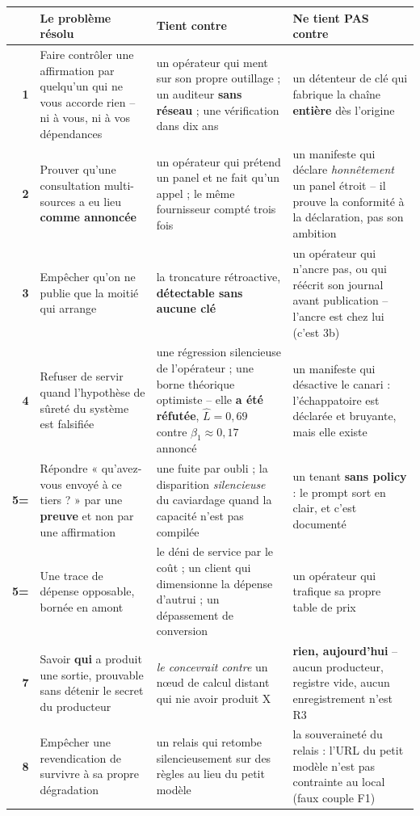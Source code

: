\documentclass[10pt]{article}
\newcommand{\pire}[1]{{\color{red}\textbf{#1}}}
\newcommand{\sz}[1]{{\small\color{grey}\textsf{#1}}}
\begin{document}
\renewcommand{\arraystretch}{1.25}
\begin{center}\footnotesize
\begin{tabular}{@{}r >{\raggedright\arraybackslash}p{4.55cm} >{\raggedright\arraybackslash}p{5.35cm} >{\raggedright\arraybackslash}p{5.35cm}@{}}
\toprule
& \textbf{Le problème résolu} & \textbf{Tient contre} & \textbf{Ne tient PAS contre} \\
\midrule
\textbf{1} & Faire contrôler une affirmation par quelqu'un qui ne vous accorde rien -- ni à vous, ni à
  vos dépendances &
  un opérateur qui ment sur son propre outillage ; un auditeur \textbf{sans réseau} ; une vérification
  dans dix ans &
  un détenteur de clé qui fabrique la chaîne \textbf{entière} dès l'origine \\
\textbf{2} & Prouver qu'une consultation multi-sources a eu lieu \textbf{comme annoncée} &
  un opérateur qui prétend un panel et ne fait qu'un appel ; le même fournisseur compté trois fois &
  un manifeste qui déclare \emph{honnêtement} un panel étroit -- il prouve la conformité à la
  déclaration, pas son ambition \\
\textbf{3} & Empêcher qu'on ne publie que la moitié qui arrange &
  la troncature rétroactive, \textbf{détectable sans aucune clé} &
  un opérateur qui n'ancre pas, ou qui réécrit son journal avant publication -- l'ancre est chez lui
  \sz{(c'est 3b)} \\
\textbf{4} & Refuser de servir quand l'hypothèse de sûreté du système est falsifiée &
  une régression silencieuse de l'opérateur ; une borne théorique optimiste -- elle \textbf{a été
  réfutée}, $\hat{L}=0{,}69$ contre $\beta_1 \approx 0{,}17$ annoncé &
  un manifeste qui désactive le canari : l'échappatoire est déclarée et bruyante, mais elle existe \\
\textbf{5=} & Répondre « qu'avez-vous envoyé à ce tiers ? » par une \textbf{preuve} et non par une
  affirmation &
  une fuite par oubli ; la disparition \emph{silencieuse} du caviardage quand la capacité n'est pas
  compilée &
  un tenant \textbf{sans policy} : le prompt sort en clair, et c'est documenté \\
\textbf{5=} & Une trace de dépense opposable, bornée en amont &
  le déni de service par le coût ; un client qui dimensionne la dépense d'autrui ; un dépassement de
  conversion &
  un opérateur qui trafique sa propre table de prix \\
\textbf{7} & Savoir \textbf{qui} a produit une sortie, prouvable sans détenir le secret du producteur &
  \emph{le concevrait contre} un n\oe ud de calcul distant qui nie avoir produit X &
  \pire{rien, aujourd'hui} -- aucun producteur, registre vide, aucun enregistrement n'est R3 \\
\textbf{8} & Empêcher une revendication de survivre à sa propre dégradation &
  un relais qui retombe silencieusement sur des règles au lieu du petit modèle &
  la souveraineté du relais : l'URL du petit modèle n'est pas contrainte au local \sz{(faux couple F1)} \\
\bottomrule
\end{tabular}
\end{center}
\end{document}
